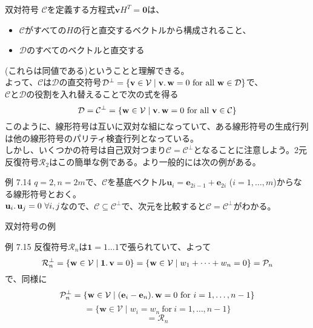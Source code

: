 \documentclass[dvipdfmx,10pt,jsarticle]{beamer}
\begin{document}
  \begin{frame}{双対符号}
    $\mathcal{C}$を定義する方程式$\mathbf{v}H^T = \mathbf{0}$は、
    \begin{itemize}
      \item $\mathcal{C}$がすべての$H$の行と直交するベクトルから構成されること、
      \item $\mathcal{D}$のすべてのベクトルと直交する
    \end{itemize}
    (これらは同値である)ということと理解できる。\\
    よって、$\mathcal{C}$は$\mathcal{D}$の直交符号$\mathcal{D}^\perp = \lbrace \mathbf{v} \in \mathcal{V} \mid \mathbf{v}\ldotp\mathbf{w} = 0 \ \text{for all} \ \mathbf{w} \in \mathcal{D} \rbrace$で、\\
    $\mathcal{C}$と$\mathcal{D}$の役割を入れ替えることで次の式を得る
    \[ \mathcal{D} = \mathcal{C}^\perp = \lbrace \mathbf{w} \in \mathcal{V} \mid \mathbf{v}\ldotp\mathbf{w} = 0 \ \text{for all} \ \mathbf{v} \in \mathcal{C} \rbrace \]
    このように、線形符号は互いに双対な組になっていて、ある線形符号の生成行列は他の線形符号のパリティ検査行列となっている。\\
    しかし、いくつかの符号は自己双対つまり$\mathcal{C}=\mathcal{C}^\perp$となることに注意しよう。2元反復符号$\mathcal{R}_2$はこの簡単な例である。より一般的には次の例がある。
    \begin{block}{例 7.14}
      $q = 2, n = 2m$で、$\mathcal{C}$を基底ベクトル$\mathbf{u}_i = \mathbf{e}_{2i - 1} + \mathbf{e}_{2i}$ ($i = 1, \ldots , m$)からなる線形符号とおく。\\
      $\mathbf{u}_i\ldotp\mathbf{u}_j = 0 \ \forall i, j$なので、$\mathcal{C} \subseteq \mathcal{C}^\perp$で、次元を比較すると$\mathcal{C} = \mathcal{C}^\perp$がわかる。
    \end{block}
  \end{frame}
  \begin{frame}{双対符号の例}
    \begin{block}{例 7.15}
      反復符号$\mathcal{R}_n$は$\mathbf{1}=1\ldots1$で張られていて、よって
      \[ \mathcal{R}_n^\perp = \lbrace \mathbf{w} \in \mathcal{V} \mid \mathbf{1} \ldotp \mathbf{v} = 0 \rbrace = \lbrace \mathbf{w} \in \mathcal{V} \mid w_1 + \cdots + w_n = 0 \rbrace = \mathcal{P}_n \]
      で、同様に
    \[\mathcal{P}_n^\perp = \lbrace \mathbf{w} \in \mathcal{V} \mid (\mathbf{e}_i - \mathbf{e}_n)\ldotp\mathbf{w} = 0 \ \text{for}\ i = 1,\ldots,n-1 \rbrace \]
      \[= \lbrace \mathbf{w} \in \mathcal{V} \mid w_i = w_n \ \text{for} \ i = 1,\ldots , n-1 \rbrace \]
      \[= \mathcal{R}_n \]
    \end{block}
  \end{frame}
\end{document}
